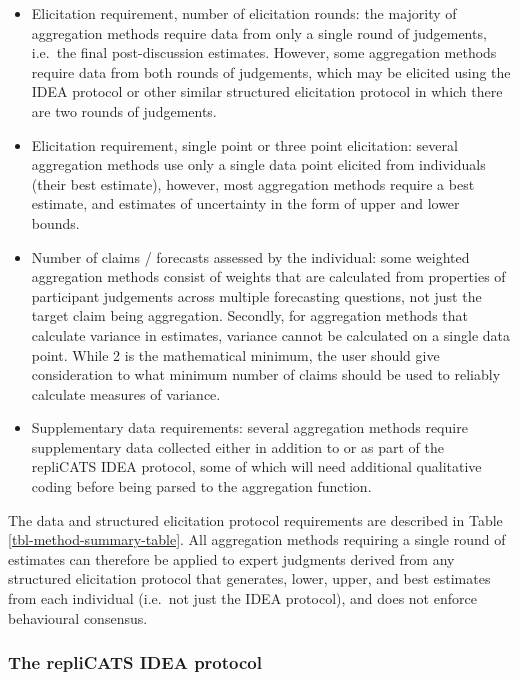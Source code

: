 \documentclass[article]{jss}
\providecommand{\tightlist}{%
  \setlength{\itemsep}{0pt}\setlength{\parskip}{0pt}}
\begin{document}
\begin{itemize}
\tightlist
\item
  Elicitation requirement, number of elicitation rounds: the majority of
  aggregation methods require data from only a single round of
  judgements, i.e.~the final post-discussion estimates. However, some
  aggregation methods require data from both rounds of judgements, which
  may be elicited using the IDEA protocol or other similar structured
  elicitation protocol in which there are two rounds of judgements.
\item
  Elicitation requirement, single point or three point elicitation:
  several aggregation methods use only a single data point elicited from
  individuals (their best estimate), however, most aggregation methods
  require a best estimate, and estimates of uncertainty in the form of
  upper and lower bounds.
\item
  Number of claims / forecasts assessed by the individual: some weighted
  aggregation methods consist of weights that are calculated from
  properties of participant judgements across multiple forecasting
  questions, not just the target claim being aggregation. Secondly, for
  aggregation methods that calculate variance in estimates, variance
  cannot be calculated on a single data point. While 2 is the
  mathematical minimum, the user should give consideration to what
  minimum number of claims should be used to reliably calculate measures
  of variance.
\item
  Supplementary data requirements: several aggregation methods require
  supplementary data collected either in addition to or as part of the
  repliCATS IDEA protocol, some of which will need additional
  qualitative coding before being parsed to the aggregation function.
\end{itemize}

The data and structured elicitation protocol requirements are described
in Table \ref{tbl-method-summary-table}. All aggregation methods
requiring a single round of estimates can therefore be applied to expert
judgments derived from any structured elicitation protocol that
generates, lower, upper, and best estimates from each individual
(i.e.~not just the IDEA protocol), and does not enforce behavioural
consensus.

\subsubsection{The repliCATS IDEA protocol}\label{sec-IDEAprotocol}
\end{document}
